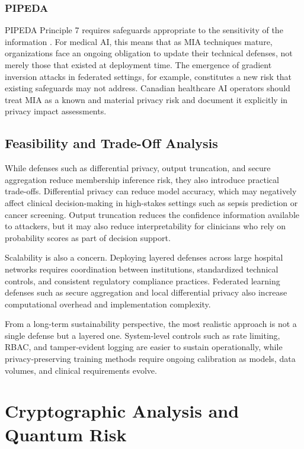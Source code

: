 \documentclass[conference]{IEEEtran}
\begin{document}
	\subsubsection{PIPEDA}
	PIPEDA Principle 7 requires safeguards appropriate to the sensitivity of the information \cite{pipeda}. For medical AI, this means that as MIA techniques mature, organizations face an ongoing obligation to update their technical defenses, not merely those that existed at deployment time. The emergence of gradient inversion attacks in federated settings, for example, constitutes a new risk that existing safeguards may not address. Canadian healthcare AI operators should treat MIA as a known and material privacy risk and document it explicitly in privacy impact assessments.
	\subsection{Feasibility and Trade-Off Analysis}

While defenses such as differential privacy, output truncation, and secure aggregation reduce membership inference risk, they also introduce practical trade-offs. Differential privacy can reduce model accuracy, which may negatively affect clinical decision-making in high-stakes settings such as sepsis prediction or cancer screening. Output truncation reduces the confidence information available to attackers, but it may also reduce interpretability for clinicians who rely on probability scores as part of decision support.

Scalability is also a concern. Deploying layered defenses across large hospital networks requires coordination between institutions, standardized technical controls, and consistent regulatory compliance practices. Federated learning defenses such as secure aggregation and local differential privacy also increase computational overhead and implementation complexity.

From a long-term sustainability perspective, the most realistic approach is not a single defense but a layered one. System-level controls such as rate limiting, RBAC, and tamper-evident logging are easier to sustain operationally, while privacy-preserving training methods require ongoing calibration as models, data volumes, and clinical requirements evolve.
	\section{Cryptographic Analysis and Quantum Risk}
\end{document}

